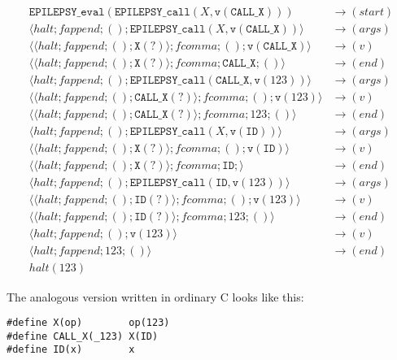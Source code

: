 \documentclass[12pt]{article}
\theoremstyle{break}
\begin{document}
\begin{example}
\begin{align*}
    \texttt{EPILEPSY\_eval}(\texttt{EPILEPSY\_call}(X, \texttt{v}(\texttt{CALL\_X}))) & \to (start) \\
    \langle halt; fappend; (); \texttt{EPILEPSY\_call}(X, \texttt{v}(\texttt{CALL\_X})) \rangle & \to (args) \\
    \langle \langle halt; fappend; (); \texttt{X}(?) \rangle; fcomma; (); \texttt{v}(\texttt{CALL\_X}) \rangle & \to (v) \\
    \langle \langle halt; fappend; (); \texttt{X}(?) \rangle; fcomma; \texttt{CALL\_X}; () \rangle & \to (end) \\
    \langle halt; fappend; (); \texttt{EPILEPSY\_call}(\texttt{CALL\_X}, \texttt{v}(123)) \rangle & \to (args) \\
    \langle \langle halt; fappend; (); \texttt{CALL\_X}(?) \rangle; fcomma; (); \texttt{v}(123) \rangle & \to (v) \\
    \langle \langle halt; fappend; (); \texttt{CALL\_X}(?) \rangle; fcomma; 123; () \rangle & \to (end) \\
    \langle halt; fappend; (); \texttt{EPILEPSY\_call}(X, \texttt{v}(\texttt{ID})) \rangle & \to (args) \\
    \langle \langle halt; fappend; (); \texttt{X}(?) \rangle; fcomma; (); \texttt{v}(\texttt{ID}) \rangle & \to (v) \\
    \langle \langle halt; fappend; (); \texttt{X}(?) \rangle; fcomma; \texttt{ID}; \rangle & \to (end) \\
    \langle halt; fappend; (); \texttt{EPILEPSY\_call}(\texttt{ID}, \texttt{v}(123)) \rangle & \to (args) \\
    \langle \langle halt; fappend; (); \texttt{ID}(?) \rangle; fcomma; (); \texttt{v}(123) \rangle & \to (v) \\
    \langle \langle halt; fappend; (); \texttt{ID}(?) \rangle; fcomma; 123; () \rangle & \to (end) \\
    \langle halt; fappend; (); \texttt{v}(123) \rangle & \to (v) \\
    \langle halt; fappend; 123; () \rangle & \to (end) \\
    halt(123) &
\end{align*}
\end{example}

The analogous version written in ordinary C looks like this:

\begin{verbatim}
#define X(op)        op(123)
#define CALL_X(_123) X(ID)
#define ID(x)        x
\end{verbatim}
\end{document}
